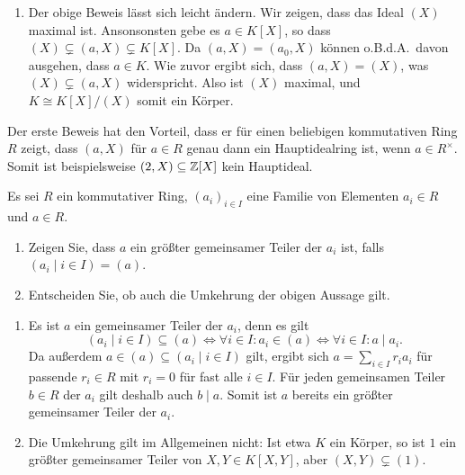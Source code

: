 \begin{solution}
\begin{enumerate}
    \item
      Der obige Beweis lässt sich leicht ändern.
      Wir zeigen, dass das Ideal $(X)$ maximal ist.
      Ansonsonsten gebe es $a \in K[X]$, so dass $(X) \subsetneq (a, X) \subsetneq K[X]$.
      Da $(a, X) = (a_0, X)$ können o.B.d.A.\ davon ausgehen, dass $a \in K$.
      Wie zuvor ergibt sich, dass $(a, X) = (X)$, was $(X) \subsetneq (a,X)$ widerspricht.
      Also ist $(X)$ maximal, und $K \cong K[X]/(X)$ somit ein Körper.
  \end{enumerate}
  Der erste Beweis hat den Vorteil, dass er für einen beliebigen kommutativen Ring $R$ zeigt, dass $(a, X)$ für $a \in R$ genau dann ein Hauptidealring ist, wenn $a \in R^\times$.
  Somit ist beispielsweise $(2, X) \subseteq \mathbb{Z}[X]$ kein Hauptideal.
\end{solution}


\begin{question}
  \label{question: greatest common divisor via generated ideal}
  Es sei $R$ ein kommutativer Ring, $(a_i)_{i \in I}$ eine Familie von Elementen $a_i \in R$ und $a \in R$.
  \begin{enumerate}
    \item
      Zeigen Sie, dass $a$ ein größter gemeinsamer Teiler der $a_i$ ist, falls $(a_i \mid i \in I) = (a)$.
    \item
      Entscheiden Sie, ob auch die Umkehrung der obigen Aussage gilt.
  \end{enumerate}
\end{question}


\begin{question}
  \begin{enumerate}
    \item
      Es ist $a$ ein gemeinsamer Teiler der $a_i$, denn es gilt
      \[
              (a_i \mid i \in I) \subseteq (a)
        \iff  \forall i \in I: a_i \in (a)
        \iff  \forall i \in I: a \mid a_i.
      \]
      Da außerdem $a \in (a) \subseteq (a_i \mid i \in I)$ gilt, ergibt sich $a = \sum_{i \in I} r_i a_i$ für passende $r_i \in R$ mit $r_i = 0$ für fast alle $i \in I$.
      Für jeden gemeinsamen Teiler $b \in R$ der $a_i$ gilt deshalb auch $b \mid a$.
      Somit ist $a$ bereits ein größter gemeinsamer Teiler der $a_i$.
    \item
      Die Umkehrung gilt im Allgemeinen nicht:
      Ist etwa $K$ ein Körper, so ist $1$ ein größter gemeinsamer Teiler von $X, Y \in K[X, Y]$, aber $(X, Y) \subsetneq (1)$.
  \end{enumerate}
\end{question}


